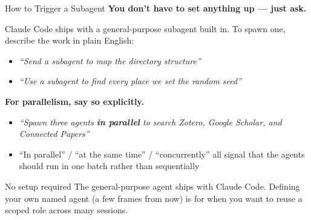 \documentclass[aspectratio=169, 11pt]{beamer}
\begin{document}
\begin{frame}{How to Trigger a Subagent}
  \textbf{You don't have to set anything up --- just ask.}

  \vspace{0.6em}
  Claude Code ships with a general-purpose subagent built in. To spawn one, describe the work in plain English:
  \begin{itemize}
    \item \textit{``Send a subagent to map the directory structure''}
    \item \textit{``Use a subagent to find every place we set the random seed''}
  \end{itemize}

  \vspace{0.6em}
  \textbf{For parallelism, say so explicitly.}
  \begin{itemize}
    \item \textit{``Spawn three agents \textbf{in parallel} to search Zotero, Google Scholar, and Connected Papers''}
    \item ``In parallel'' / ``at the same time'' / ``concurrently'' all signal that the agents should run in one batch rather than sequentially
  \end{itemize}

  \vspace{0.6em}
  \begin{block}{No setup required}
    The general-purpose agent ships with Claude Code. Defining your own named agent (a few frames from now) is for when you want to reuse a scoped role across many sessions.
  \end{block}
\end{frame}
\end{document}
